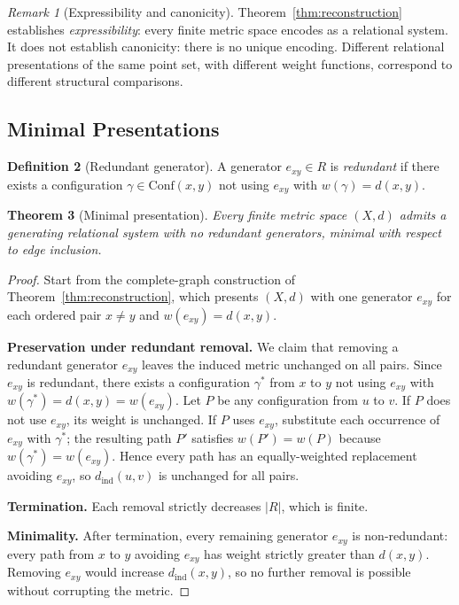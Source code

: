 \documentclass{article}
\newtheorem{theorem}{Theorem}[section]
\theoremstyle{definition}
\newtheorem{definition}[theorem]{Definition}
\theoremstyle{remark}
\newtheorem{remark}[theorem]{Remark}
\begin{document}
\begin{remark}[Expressibility and canonicity]
\label{rem:expressibility}
Theorem~\ref{thm:reconstruction} establishes \emph{expressibility}:
every finite metric space encodes as a relational system. It does
not establish canonicity: there is no unique encoding. Different
relational presentations of the same point set, with different
weight functions, correspond to different structural comparisons.
\end{remark}

\subsection{Minimal Presentations}

\begin{definition}[Redundant generator]
A generator $e_{xy} \in R$ is \emph{redundant} if there exists a
configuration $\gamma \in \mathrm{Conf}(x,y)$ not using $e_{xy}$
with $w(\gamma) = d(x,y)$.
\end{definition}

\begin{theorem}[Minimal presentation]
\label{thm:minimal}
Every finite metric space $(X,d)$ admits a generating relational
system with no redundant generators, minimal with respect to edge
inclusion.
\end{theorem}

\begin{proof}
Start from the complete-graph construction of
Theorem~\ref{thm:reconstruction}, which presents $(X,d)$ with one
generator $e_{xy}$ for each ordered pair $x \neq y$ and
$w(e_{xy}) = d(x,y)$.

\textbf{Preservation under redundant removal.}
We claim that removing a redundant generator $e_{xy}$ leaves the
induced metric unchanged on all pairs. Since $e_{xy}$ is redundant,
there exists a configuration $\gamma^*$ from $x$ to $y$ not using
$e_{xy}$ with $w(\gamma^*) = d(x,y) = w(e_{xy})$. Let $P$ be any
configuration from $u$ to $v$. If $P$ does not use $e_{xy}$, its
weight is unchanged. If $P$ uses $e_{xy}$, substitute each
occurrence of $e_{xy}$ with $\gamma^*$; the resulting path $P'$
satisfies $w(P') = w(P)$ because $w(\gamma^*) = w(e_{xy})$.
Hence every path has an equally-weighted replacement avoiding
$e_{xy}$, so $d_{\mathrm{ind}}(u,v)$ is unchanged for all pairs.

\textbf{Termination.}
Each removal strictly decreases $|R|$, which is finite.

\textbf{Minimality.}
After termination, every remaining generator $e_{xy}$ is
non-redundant: every path from $x$ to $y$ avoiding $e_{xy}$ has
weight strictly greater than $d(x,y)$. Removing $e_{xy}$ would
increase $d_{\mathrm{ind}}(x,y)$, so no further removal is possible
without corrupting the metric.
\end{proof}
\end{document}
